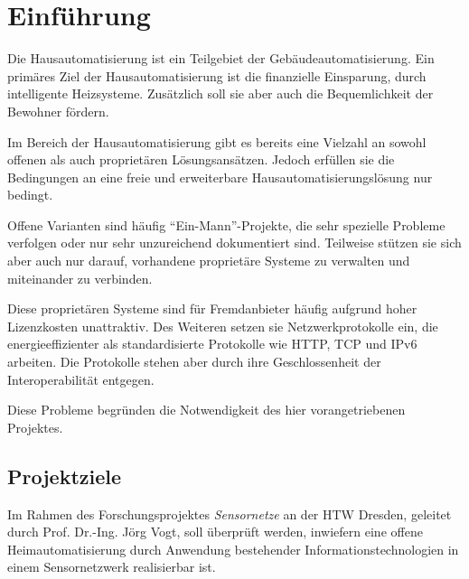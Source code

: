 \section{Einführung}
	Die Hausautomatisierung ist ein Teilgebiet der Gebäudeautomatisierung.
	Ein primäres Ziel der Hausautomatisierung ist die finanzielle
	Einsparung, \zB durch intelligente Heizsysteme.
	Zusätzlich soll sie aber auch die Bequemlichkeit der Bewohner fördern.

	Im Bereich der Hausautomatisierung gibt es bereits eine Vielzahl an
	sowohl offenen als auch proprietären Lösungsansätzen.  Jedoch
	erfüllen sie die Bedingungen an eine freie und erweiterbare
	Hausautomatisierungslösung nur bedingt.

	Offene Varianten sind häufig \enquote{Ein-Mann}-Projekte, die
	sehr spezielle Probleme verfolgen oder nur sehr unzureichend
	dokumentiert sind.  Teilweise stützen sie sich aber auch nur darauf,
	vorhandene proprietäre Systeme zu verwalten und miteinander zu
	verbinden.

	Diese proprietären Systeme sind für Fremdanbieter häufig aufgrund hoher
	Lizenzkosten unattraktiv.  Des Weiteren setzen sie Netzwerkprotokolle
	ein, die energieeffizienter als standardisierte Protokolle wie HTTP, TCP
	und IPv6 arbeiten. Die Protokolle stehen aber durch ihre Geschlossenheit
	der Interoperabilität entgegen.


	Diese Probleme begründen die Notwendigkeit des hier vorangetriebenen
	Projektes.

\subsection{Projektziele}
	Im Rahmen des Forschungsprojektes \emph{Sensornetze} an der HTW Dresden,
	geleitet durch Prof. Dr.-Ing. Jörg Vogt, soll überprüft werden, inwiefern
	eine offene Heimautomatisierung durch Anwendung bestehender
	Informationstechnologien in einem Sensornetzwerk realisierbar ist.

